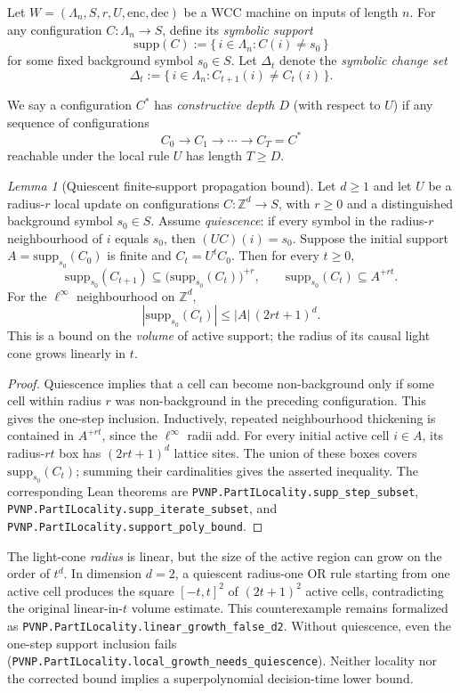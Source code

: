 \documentclass[12pt]{article}
\newcommand{\enc}{\mathrm{enc}}
\newcommand{\dec}{\mathrm{dec}}
\theoremstyle{remark}
\newtheorem{lemma}[theorem]{Lemma}
\begin{document}
Let $W = (\Lambda_n,S,r,U,\enc,\dec)$ be a WCC machine on inputs of length
$n$. For any configuration $C : \Lambda_n \to S$, define its \emph{symbolic
support}
\[
\mathrm{supp}(C) := \{\, i \in \Lambda_n : C(i) \neq s_0 \,\}
\]
for some fixed background symbol $s_0 \in S$. Let $\Delta_t$ denote the
\emph{symbolic change set}
\[
\Delta_t := \{\, i \in \Lambda_n : C_{t+1}(i) \neq C_t(i) \,\}.
\]

We say a configuration $C^*$ has \emph{constructive depth $D$} (with respect
to $U$) if any sequence of configurations
\[
C_0 \to C_1 \to \cdots \to C_T = C^*
\]
reachable under the local rule $U$ has length $T \ge D$.

\begin{lemma}[Quiescent finite-support propagation bound]
\label{lem:local_growth}
Let $d\ge1$ and let $U$ be a radius-$r$ local update on
configurations $C:\mathbb Z^d\to S$, with $r\ge0$ and a distinguished
background symbol $s_0\in S$. Assume \emph{quiescence}: if every symbol
in the radius-$r$ neighbourhood of $i$ equals $s_0$, then
$(UC)(i)=s_0$. Suppose the initial support
$A=\mathrm{supp}_{s_0}(C_0)$ is finite and $C_t=U^t C_0$.
Then for every $t\ge0$,
\[
 \mathrm{supp}_{s_0}(C_{t+1})
 \subseteq \bigl(\mathrm{supp}_{s_0}(C_t)\bigr)^{+r},
 \qquad
 \mathrm{supp}_{s_0}(C_t)\subseteq A^{+rt}.
\]
For the $\ell^\infty$ neighbourhood on $\mathbb Z^d$,
\[
 \boxed{\;
  |\mathrm{supp}_{s_0}(C_t)|
  \le |A|\,(2rt+1)^d.
 \;}
\]
This is a bound on the \emph{volume} of active support; the radius
of its causal light cone grows linearly in $t$.
\end{lemma}

\begin{proof}
Quiescence implies that a cell can become non-background only if
some cell within radius $r$ was non-background in the preceding
configuration. This gives the one-step inclusion. Inductively,
repeated neighbourhood thickening is contained in
$A^{+rt}$, since the $\ell^\infty$ radii add.
For every initial active cell $i\in A$, its radius-$rt$ box has
$(2rt+1)^d$ lattice sites. The union of these boxes covers
$\mathrm{supp}_{s_0}(C_t)$; summing their cardinalities gives
the asserted inequality. The corresponding Lean theorems are
\nolinkurl{PVNP.PartILocality.supp_step_subset},
\nolinkurl{PVNP.PartILocality.supp_iterate_subset}, and
\nolinkurl{PVNP.PartILocality.support_poly_bound}.
\end{proof}

The light-cone \emph{radius} is linear, but the size of the active
region can grow on the order of $t^d$. In dimension $d=2$, a
quiescent radius-one OR rule starting from one active cell produces
the square $[-t,t]^2$ of $(2t+1)^2$ active cells, contradicting
the original linear-in-$t$ volume estimate. This counterexample
remains formalized as
\nolinkurl{PVNP.PartILocality.linear_growth_false_d2}.
Without quiescence, even the one-step support inclusion fails
(\nolinkurl{PVNP.PartILocality.local_growth_needs_quiescence}).
Neither locality nor the corrected bound implies a superpolynomial
decision-time lower bound.
\end{document}
